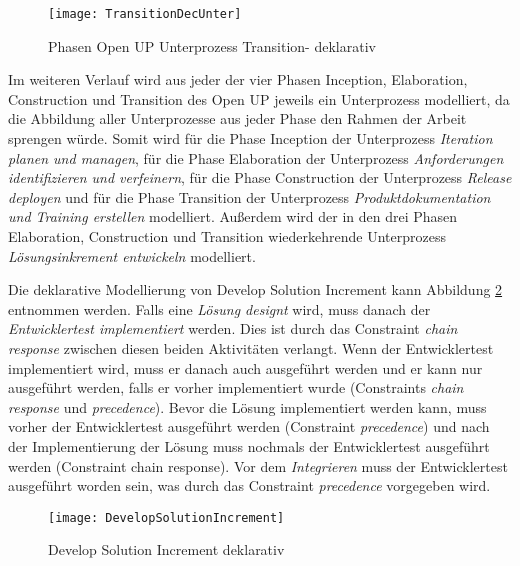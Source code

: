 \begin{figure}[htp]
\begin{center}
  \texttt{[image: TransitionDecUnter]} %
  \caption{Phasen Open UP Unterprozess Transition- deklarativ}
  \label{fig:TransitionDecUnter}
\end{center}
\end{figure}



Im weiteren Verlauf wird aus jeder der vier Phasen Inception, Elaboration, Construction und Transition des Open UP jeweils ein Unterprozess modelliert, da die Abbildung aller Unterprozesse aus jeder Phase den Rahmen der Arbeit sprengen würde. \newline
Somit wird für die Phase Inception der Unterprozess \textit{Iteration planen und managen}, für die Phase Elaboration der Unterprozess \textit{Anforderungen identifizieren und verfeinern}, für die Phase Construction der Unterprozess \textit{Release deployen} und für die Phase Transition der Unterprozess \textit{Produktdokumentation und Training erstellen} modelliert. Außerdem wird der in den drei Phasen Elaboration, Construction und Transition wiederkehrende Unterprozess \textit{Lösungsinkrement entwickeln} modelliert.


Die deklarative Modellierung von Develop Solution Increment kann Abbildung \ref{fig:Develop} entnommen werden.\newline
Falls eine \textit{Lösung designt} wird, muss danach der \textit{Entwicklertest implementiert} werden. Dies ist durch das Constraint \textit{chain response} zwischen diesen beiden Aktivitäten verlangt. Wenn der Entwicklertest implementiert wird, muss er danach auch ausgeführt werden und er kann nur ausgeführt werden, falls er vorher implementiert wurde (Constraints \textit{chain response} und \textit{precedence}).\newline
Bevor die Lösung implementiert werden kann, muss vorher der Entwicklertest ausgeführt werden (Constraint \textit{precedence}) und nach der Implementierung der Lösung muss nochmals der Entwicklertest ausgeführt werden (Constraint chain response).\newline
Vor dem \textit{Integrieren} muss der Entwicklertest ausgeführt worden sein, was durch das Constraint \textit{precedence} vorgegeben wird.
\begin{figure}[htp]
\begin{center}
  \texttt{[image: DevelopSolutionIncrement]} %
  \caption{Develop Solution Increment deklarativ}
  \label{fig:Develop}
\end{center}
\end{figure}


